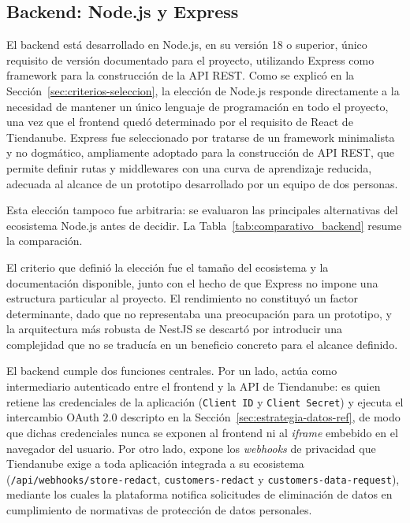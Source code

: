 \subsection{Backend: Node.js y Express}
\label{sec:backend-node-express}

El backend está desarrollado en Node.js, en su versión 18 o superior, único requisito de versión documentado para el proyecto, utilizando Express como framework para la construcción de la API REST. Como se explicó en la Sección~\ref{sec:criterios-seleccion}, la elección de Node.js responde directamente a la necesidad de mantener un único lenguaje de programación en todo el proyecto, una vez que el frontend quedó determinado por el requisito de React de Tiendanube. Express fue seleccionado por tratarse de un framework minimalista y no dogmático, ampliamente adoptado para la construcción de API REST, que permite definir rutas y middlewares con una curva de aprendizaje reducida, adecuada al alcance de un prototipo desarrollado por un equipo de dos personas.

Esta elección tampoco fue arbitraria: se evaluaron las principales alternativas del ecosistema Node.js antes de decidir. La Tabla~\ref{tab:comparativo_backend} resume la comparación.

El criterio que definió la elección fue el tamaño del ecosistema y la documentación disponible, junto con el hecho de que Express no impone una estructura particular al proyecto. El rendimiento no constituyó un factor determinante, dado que no representaba una preocupación para un prototipo, y la arquitectura más robusta de NestJS se descartó por introducir una complejidad que no se traducía en un beneficio concreto para el alcance definido.

El backend cumple dos funciones centrales. Por un lado, actúa como intermediario autenticado entre el frontend y la API de Tiendanube: es quien retiene las credenciales de la aplicación (\texttt{Client ID} y \texttt{Client Secret}) y ejecuta el intercambio OAuth 2.0 descripto en la Sección~\ref{sec:estrategia-datos-ref}, de modo que dichas credenciales nunca se exponen al frontend ni al \emph{iframe} embebido en el navegador del usuario. Por otro lado, expone los \emph{webhooks} de privacidad que Tiendanube exige a toda aplicación integrada a su ecosistema (\texttt{/api/webhooks/store-redact}, \texttt{customers-redact} y \texttt{customers-data-request}), mediante los cuales la plataforma notifica solicitudes de eliminación de datos en cumplimiento de normativas de protección de datos personales.

